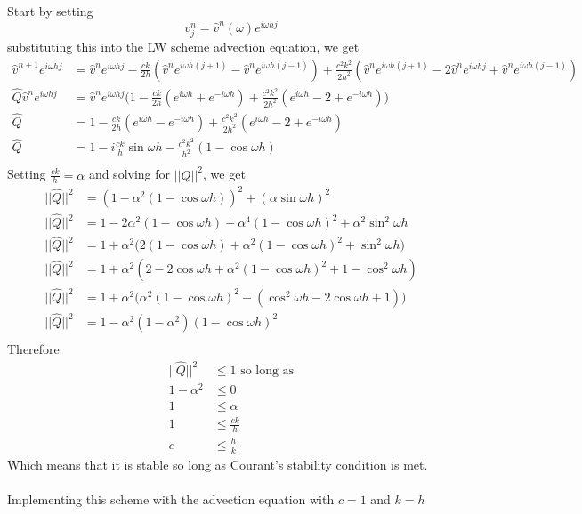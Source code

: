\\
\\
Start by setting
\begin{equation*}
  v^n_j = \hat{v}^n(\omega)e^{i\omega hj}
\end{equation*}
substituting this into the LW scheme advection equation, we get
\begin{equation*}
\begin{align}
  \hat{v}^{n+1}e^{i\omega hj} &= \hat{v}^ne^{i\omega hj}-\frac{ck}{2h}(\hat{v}^ne^{i\omega h(j+1)} - \hat{v}^ne^{i\omega h(j-1)}) + \frac{c^2k^2}{2h^2}(\hat{v}^ne^{i\omega h(j+1)} -2\hat{v}^ne^{i\omega hj} + \hat{v}^ne^{i\omega h(j-1)}) \\
  \hat{Q}\hat{v}^ne^{i\omega hj} &= \hat{v}^ne^{i\omega hj} \big(1 - \frac{ck}{2h}(e^{i\omega h}+e^{-i\omega h}) + \frac{c^2k^2}{2h^2}(e^{i\omega h} -2+ e^{-i\omega h})\big)\\
  \hat{Q} &= 1 - \frac{ck}{2h}(e^{i\omega h}-e^{-i\omega h}) + \frac{c^2k^2}{2h^2}(e^{i\omega h} -2+ e^{-i\omega h})\\
  \hat{Q} &= 1 - i\frac{ck}{h}\sin\omega h - \frac{c^2k^2}{h^2}(1 - \cos\omega h)\\
\end{align}
\end{equation*}
Setting $\frac{ck}{h}=\alpha$ and solving for $||\hat{Q}||^2$, we get
\begin{equation*}
\begin{align}
  ||\hat{Q}||^2 &= (1 - \alpha^2(1 - \cos\omega h))^2 + (\alpha\sin\omega h)^2\\
  ||\hat{Q}||^2 &= 1 - 2\alpha^2(1 - \cos\omega h) + \alpha^4(1 - \cos\omega h)^2 + \alpha^2\sin^2\omega h\\
  ||\hat{Q}||^2 &= 1 + \alpha^2 \big( 2(1 - \cos\omega h) + \alpha^2(1 - \cos\omega h)^2 + \sin^2\omega h \big)\\
  ||\hat{Q}||^2 &= 1 + \alpha^2 ( 2 - 2\cos\omega h + \alpha^2(1 - \cos\omega h)^2 + 1 -\cos^2\omega h )\\
  ||\hat{Q}||^2 &= 1 + \alpha^2 \big( \alpha^2(1 - \cos\omega h)^2 - (\cos^2\omega h - 2\cos\omega h + 1) \big)\\
  ||\hat{Q}||^2 &= 1 - \alpha^2 (1 - \alpha^2)(1 - \cos\omega h)^2\\
\end{align}
\end{equation*}
Therefore
\begin{equation*}
\begin{align}
  ||\hat{Q}||^2 &\leq 1 \text{ so long as}\\
  1- \alpha^2 	&\leq 0 \\
  1	 	&\leq \alpha \\
  1		&\leq \frac{ck}{h} \\
  c		&\leq \frac{h}{k}
\end{align}
\end{equation*}
Which means that it is stable so long as Courant's stability condition is met.
\\
\\
Implementing this scheme with the advection equation with $c=1$ and $k=h$




